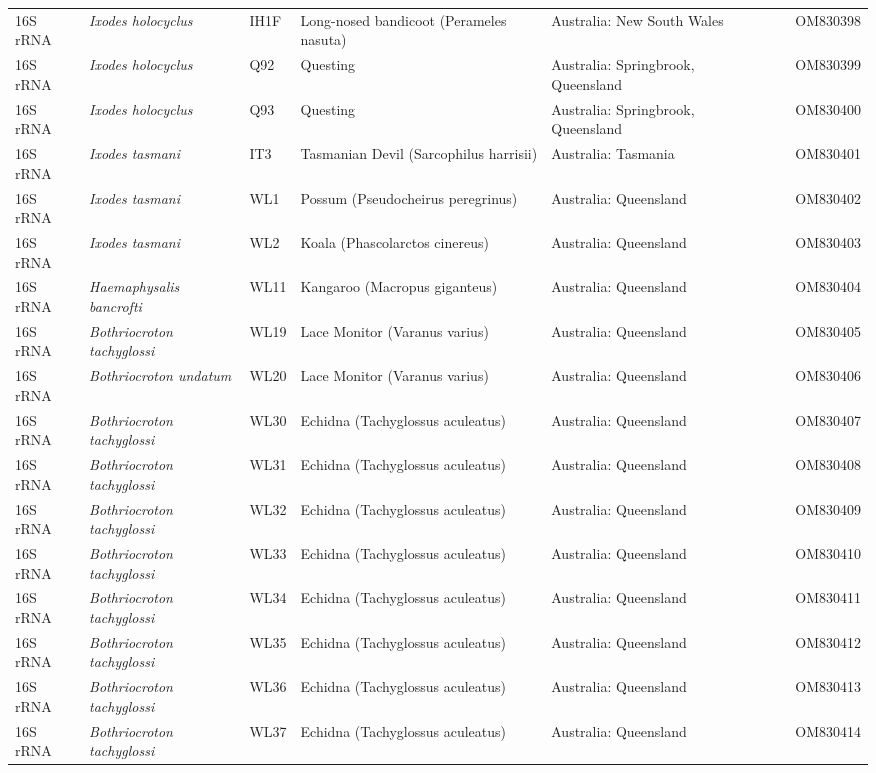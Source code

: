 \documentclass[a4paper, nobind]{templates/ociamthesis}
\begin{document}
\begin{landscape}
\begin{longtable}[t]{l>{}lllllll}
16S rRNA & \em{Ixodes holocyclus} & IH1F & Long-nosed bandicoot (Perameles nasuta) & Australia: New South Wales &  &  & OM830398\\
16S rRNA & \em{Ixodes holocyclus} & Q92 & Questing & Australia: Springbrook, Queensland &  &  & OM830399\\
16S rRNA & \em{Ixodes holocyclus} & Q93 & Questing & Australia: Springbrook, Queensland &  &  & OM830400\\
16S rRNA & \em{Ixodes tasmani} & IT3 & Tasmanian Devil (Sarcophilus harrisii) & Australia: Tasmania &  &  & OM830401\\
16S rRNA & \em{Ixodes tasmani} & WL1 & Possum (Pseudocheirus peregrinus) & Australia: Queensland &  &  & OM830402\\
16S rRNA & \em{Ixodes tasmani} & WL2 & Koala (Phascolarctos  cinereus) & Australia: Queensland &  &  & OM830403\\
16S rRNA & \em{Haemaphysalis bancrofti} & WL11 & Kangaroo (Macropus giganteus) & Australia: Queensland &  &  & OM830404\\
16S rRNA & \em{Bothriocroton tachyglossi} & WL19 & Lace Monitor (Varanus varius) & Australia: Queensland &  &  & OM830405\\
16S rRNA & \em{Bothriocroton undatum} & WL20 & Lace Monitor (Varanus varius) & Australia: Queensland &  &  & OM830406\\
16S rRNA & \em{Bothriocroton tachyglossi} & WL30 & Echidna (Tachyglossus aculeatus) & Australia: Queensland &  &  & OM830407\\
16S rRNA & \em{Bothriocroton tachyglossi} & WL31 & Echidna (Tachyglossus aculeatus) & Australia: Queensland &  &  & OM830408\\
16S rRNA & \em{Bothriocroton tachyglossi} & WL32 & Echidna (Tachyglossus aculeatus) & Australia: Queensland &  &  & OM830409\\
16S rRNA & \em{Bothriocroton tachyglossi} & WL33 & Echidna (Tachyglossus aculeatus) & Australia: Queensland &  &  & OM830410\\
16S rRNA & \em{Bothriocroton tachyglossi} & WL34 & Echidna (Tachyglossus aculeatus) & Australia: Queensland &  &  & OM830411\\
16S rRNA & \em{Bothriocroton tachyglossi} & WL35 & Echidna (Tachyglossus aculeatus) & Australia: Queensland &  &  & OM830412\\
16S rRNA & \em{Bothriocroton tachyglossi} & WL36 & Echidna (Tachyglossus aculeatus) & Australia: Queensland &  &  & OM830413\\
16S rRNA & \em{Bothriocroton tachyglossi} & WL37 & Echidna (Tachyglossus aculeatus) & Australia: Queensland &  &  & OM830414\\

\end{longtable}
\end{landscape}
\end{document}
